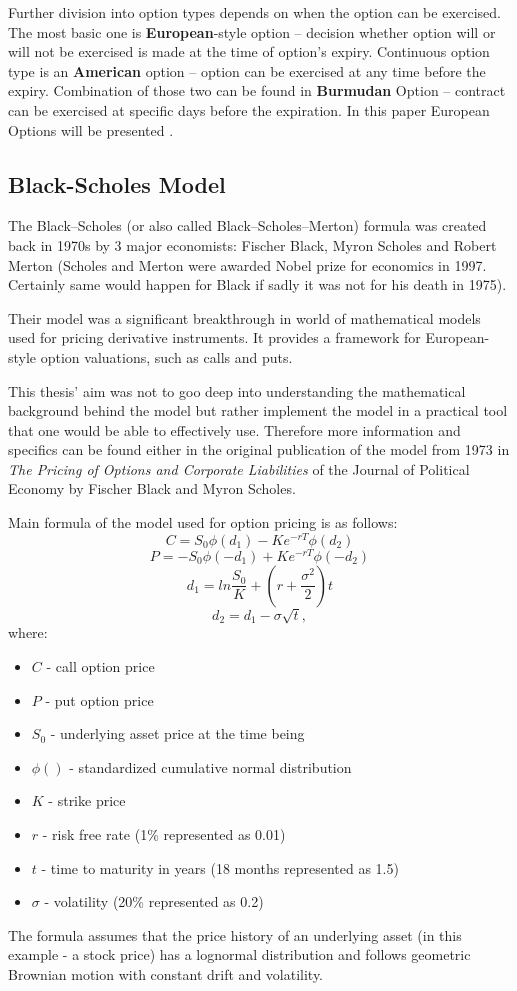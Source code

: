     Further division into option types depends on when the option can be exercised. The most basic one is \textbf{European}-style option -- decision whether option will or will not be exercised is made at the time of option's expiry. Continuous option type is an \textbf{American} option -- option can be exercised at any time before the expiry. Combination of those two can be found in \textbf{Burmudan} Option -- contract can be exercised at specific days before the expiration. In this paper European Options will be presented \cite{Option_Types}.

\subsection{Black-Scholes Model}
    The Black--Scholes (or also called Black--Scholes--Merton) formula was created back in 1970s by 3 major economists: Fischer Black, Myron Scholes and Robert Merton (Scholes and Merton were awarded Nobel prize for economics in 1997. Certainly same would happen for Black if sadly it was not for his death in 1975).
    
    Their model was a significant breakthrough in world of mathematical models used for pricing derivative instruments. It provides a framework for European-style option valuations, such as calls and puts.
    
    This thesis' aim was not to goo deep into understanding the mathematical background behind the model but rather implement the model in a practical tool that one would be able to effectively use. Therefore more information and specifics can be found either in the original publication \cite{10.2307/1831029} of the model from 1973 in \textit{The Pricing of Options and Corporate Liabilities} of the Journal of Political Economy by Fischer Black and Myron Scholes.
    
    Main formula of the model used for option pricing is as follows:
    $$
    C = S_0\phi(d_1) - Ke^{-rT}\phi(d_2)
    $$
    $$
    P = -S_0\phi(-d_1) + Ke^{-rT}\phi(-d_2)
    $$
    $$
    d_1 = ln\frac{S_0}{K} + (r+\frac{\sigma^2}{2})t
    $$
    $$
    d_2 = d_1 - \sigma\sqrt{t},
    $$
    where:
    \begin{itemize}
        \item $C$ - call option price
        \item $P$ - put option price
        \item $S_0$ - underlying asset price at the time being
        \item $\phi()$ - standardized cumulative normal distribution
        \item $K$ - strike price
        \item $r$ - risk free rate (1\% represented as 0.01)
        \item $t$ - time to maturity in years (18 months represented as 1.5)
        \item $\sigma$ - volatility (20\% represented as 0.2)
    
    \end{itemize}
    
    The formula assumes that the price history of an underlying asset (in this example - a stock price) has a lognormal distribution and follows geometric Brownian motion with constant drift and volatility. 

